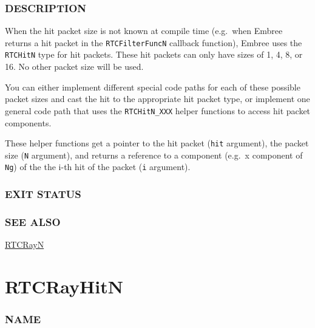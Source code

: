 \subsubsection{DESCRIPTION}\label{description}

When the hit packet size is not known at compile time (e.g.~when Embree
returns a hit packet in the \texttt{RTCFilterFuncN} callback function),
Embree uses the \texttt{RTCHitN} type for hit packets. These hit packets
can only have sizes of 1, 4, 8, or 16. No other packet size will be
used.

You can either implement different special code paths for each of these
possible packet sizes and cast the hit to the appropriate hit packet
type, or implement one general code path that uses the
\texttt{RTCHitN\_XXX} helper functions to access hit packet components.

These helper functions get a pointer to the hit packet (\texttt{hit}
argument), the packet size (\texttt{N} argument), and returns a
reference to a component (e.g.~x component of \texttt{Ng}) of the the
i-th hit of the packet (\texttt{i} argument).

\subsubsection{EXIT STATUS}\label{exit-status}

\subsubsection{SEE ALSO}\label{see-also}

\hyperref[rtcrayn]{RTCRayN}

\pagebreak

\section{RTCRayHitN}\label{rtcrayhitn}

\subsubsection{NAME}\label{name}

\begin{Shaded}
\begin{Highlighting}[]
\OperatorTok{{-}}\OperatorTok{/}
\end{Highlighting}
\end{Shaded}

